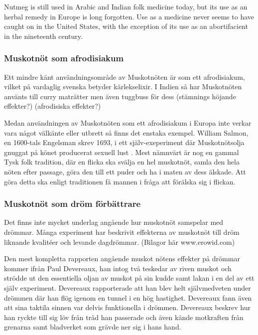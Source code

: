 Nutmeg is still used in Arabic and Indian folk medicine today, but its use as an herbal remedy in
Europe is long forgotten. Use as a medicine never seems to have caught on in the United
States, with the exception of its use as an abortifacient in the nineteenth century.



\subsubsection{Muskotnöt som afrodisiakum}

Ett mindre känt användningsområde av Muskotnöten är som ett afrodisiakum, vilket på vardaglig svenska betyder
kärlekselixir.
I Indien så har Muskotnöten använts till curry maträtter men även tuggbuss för dess (stämnings höjande effekter?) (afrodisiska effekter?) \cite{ratsch2005encyclopedia}

Medan användningen av Muskotnöten som ett afrodisiakum i Europa inte verkar vara något välkänte eller utbrett så
finns det enstaka exempel. William Salmon, en 1600-tals Engelsman skrev 1693, i ett själv-exeperiment där
Muskotnötsolja gnuggat på könet producerat sexuell lust \cite{RudgleyR}.
Mest nämnvärt är nog en gammal Tysk folk tradition, där en flicka ska svälja en hel muskotnöt, samla den hela nöten
efter passage, göra den till ett puder och ha i maten av dess älskade. Att göra detta ska enligt traditionen
få mannen i fråga att förälska sig i flickan. \cite{ratsch2005encyclopedia}



\subsubsection{Muskotnöt som dröm förbättrare}

Det finns inte mycket underlag angående hur muskotnöt samspelar med drömmar. Många experiment har beskrivit effekterna
av muskotnöt till dröm liknande kvalitéer och levande dagdrömmar. \cite{entheogenreview}
(Bilagor här www.erowid.com)

Den mest kompletta rapporten angående muskot nötens effekter på drömmar kommer ifrån Paul Devereaux, han intog
två teskedar av riven muskot och strödde ut den essentiella oljan av muskot på sin kudde samt lakan i en del
av ett själv experiment. Devereaux rapporterade att han blev helt självmedveten under drömmen där han flög igenom
en tunnel i en hög hastighet. Devereaux fann även att sina taktila sinnen var delvis funktionella i drömmen.
Devereaux beskrev hur han ryckte till sig löv från träd han passerade och även kände motkraften från grenarna samt
bladverket som grävde ner sig i hans hand. \cite{RudgleyR}

